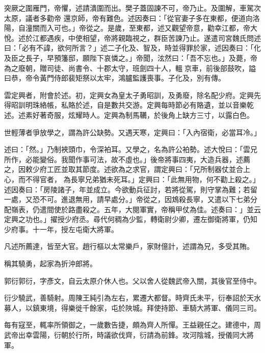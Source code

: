 \begin{pinyinscope}
 突厥之圍雁門，帝懼，述請潰圍而出。樊子蓋固諫不可，帝乃止。及圍解，車駕次太原，議者多勸帝
 還京師，帝有難色。述因奏曰：「從官妻子多在東都，便道向洛陽，自潼關而入可也。」帝從之。是歲，至東都，述又觀望帝意，勸幸江都，帝大悅。述於江都遇疾，中使相望，帝將親臨視之，群臣苦諫乃止。遂遣司宮魏氏問述曰：「必有不諱，欲何所言？」述二子化及、智及，時並得罪於家，述因奏曰：「化及臣之長子，早預籓邸，願陛下哀憐之。」帝聞，泫然曰：「吾不忘也。」及薨，帝為之廢朝，贈司徒、尚書令、十郡太守，班劍四十人，轀京車，前後部鼓吹，謚曰恭，帝令黃門侍郎裴矩祭以太牢，鴻臚監護喪事。子化及，別有傳。



 雲定興者，附會於述。初，定興女為皇太子勇昭訓，及勇廢，除名配少府。定興先得昭訓明珠絡帳，私賂於述，自是數共交游。定興每時節必有賂遺，並以音樂乾述。述素好著奇服，炫耀時人。定興為制馬韉，於後角上缺方三寸，以露白色。



 世輕薄者爭放學之，謂為許公缺勢。又遇天寒，定興曰：「入內宿衛，必當耳冷。」



 述曰：「然。」乃制裌頭巾，令深袙耳。又學之，名為許公袙勢。述大悅曰：「雲兄所作，必能變俗。我聞作事可法，故不虛也。」後帝將事四夷，大造兵器，述薦之，因敕少府工匠並取其節度。述欲為之求官，謂定興曰：「兄所制器仗並合上心，而不得官者，
 為長寧兄弟猶未死耳。」定興曰：「此無用物，何不勸上殺之。」述因奏曰：「房陵諸子，年並成立。今欲動兵征討，若將從駕，則守掌為難；若留一處，又恐不可。進退無用，請早處分。」帝從之，因鴆殺長寧，又遣以下七弟分配嶺表，仍遣間使於路盡殺之。五年，大閱軍實，帝稱甲仗為佳。述奏曰：」並云定興之功也。」擢授少府丞。尋代何稠為少監，轉衛尉少卿，遷左御衛將軍，仍知少府事。十一年，授左屯衛大將軍。



 凡述所薦達，皆至大官。趙行樞以太常樂戶，家財億計，述謂為兄，多受其賄。



 稱其驍勇，起家為折沖郎將。



 郭衍郭衍，字彥文，自云太原介休人也。父以舍人從魏武帝入關，其後官至侍中。



 衍少驍武，善騎射。周陳王純引為左右，累遷大都督。時齊氏未平，衍奉詔於天水募人，以鎮東境，得樂徙千餘家，屯於陜城。拜使持節、車騎大將軍、儀同三司。



 每有寇至，輒率所領御之，一歲數告捷，頗為齊人所憚。王益親任之。建德中，周武帝出幸雲陽，衍朝於行所，時議欲伐齊，衍請為前鋒。攻河陰城，授儀同大將軍。




\end{pinyinscope}
